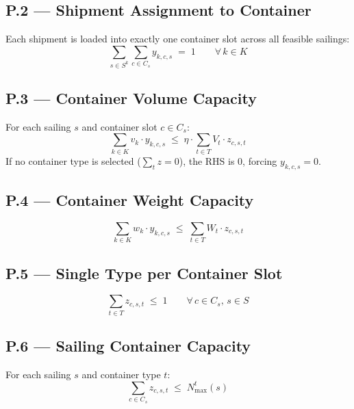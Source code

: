 \documentclass[11pt,a4paper]{article}
\theoremstyle{definition}
\begin{document}
\subsection*{P.2 — Shipment Assignment to Container}

Each shipment is loaded into exactly one container slot across all feasible sailings:
\begin{equation}
  \sum_{s \in S^k} \sum_{c \in C_s} y_{k,c,s} \;=\; 1 \qquad \forall\, k \in K
  \label{eq:lcl-P2}
\end{equation}

\subsection*{P.3 — Container Volume Capacity}

For each sailing $s$ and container slot $c \in C_s$:
\begin{equation}
  \sum_{k \in K} v_k \cdot y_{k,c,s} \;\leq\; \eta \cdot \sum_{t \in T} V_t \cdot z_{c,s,t}
  \label{eq:lcl-P3}
\end{equation}
If no container type is selected ($\sum_t z = 0$), the RHS is 0, forcing $y_{k,c,s} = 0$.

\subsection*{P.4 — Container Weight Capacity}

\begin{equation}
  \sum_{k \in K} w_k \cdot y_{k,c,s} \;\leq\; \sum_{t \in T} W_t \cdot z_{c,s,t}
  \label{eq:lcl-P4}
\end{equation}

\subsection*{P.5 — Single Type per Container Slot}

\begin{equation}
  \sum_{t \in T} z_{c,s,t} \;\leq\; 1 \qquad \forall\, c \in C_s,\, s \in S
  \label{eq:lcl-P5}
\end{equation}

\subsection*{P.6 — Sailing Container Capacity}

For each sailing $s$ and container type $t$:
\begin{equation}
  \sum_{c \in C_s} z_{c,s,t} \;\leq\; N_{\max}^t(s)
  \label{eq:lcl-P6}
\end{equation}
\end{document}
